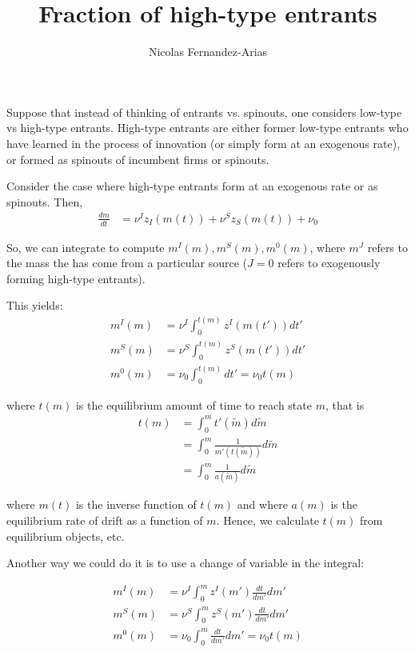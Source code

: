 \documentclass[12pt,english]{article}
\theoremstyle{remark}
\begin{document}
	
\title{Fraction of high-type entrants}
\author{Nicolas Fernandez-Arias}
\maketitle

Suppose that instead of thinking of entrants vs. spinouts, one considers low-type vs high-type entrants. High-type entrants are either former low-type entrants who have learned in the process of innovation (or simply form at an exogenous rate), or formed as spinouts of incumbent firms or spinouts. 

Consider the case where high-type entrants form at an exogenous rate or as spinouts. Then, 
\begin{align*}
	\frac{dm}{dt} &= \nu^I z_I(m(t)) + \nu^S z_S(m(t)) + \nu_0
\end{align*}

So, we can integrate to compute $m^I(m),m^S(m),m^0(m)$, where $m^J$ refers to the mass the has come from a particular source ($J = 0$ refers to exogenously forming high-type entrants).

This yields: 
\begin{align*}
	m^I(m) &= \nu^I \int_0^{t(m)} z^I(m(t')) dt' \\
	m^S(m) &= \nu^S \int_0^{t(m)} z^S(m(t')) dt'\\
	m^0(m) &= \nu_0 \int_0^{t(m)} dt' = \nu_0 t(m)
\end{align*}

where $t(m)$ is the equilibrium amount of time to reach state $m$, that is
\begin{align*}
	t(m) &= \int_0^m t'(\tilde{m}) d\tilde{m} \\
	     &= \int_0^m \frac{1}{m'(t(\tilde{m}))} d\tilde{m} \\
	     &= \int_0^m \frac{1}{a(\tilde{m})} d\tilde{m}
\end{align*}

where $m(t)$ is the inverse function of $t(m)$ and where $a(m)$ is the equilibrium rate of drift as a function of $m$. Hence, we calculate $t(m)$ from equilibrium objects, etc.

Another way we could do it is to use a change of variable in the integral:

\begin{align*}
m^I(m) &= \nu^I \int_0^m z^I(m') \frac{dt}{dm'} dm' \\
m^S(m) &= \nu^S \int_0^m z^S(m') \frac{dt}{dm'} dm' \\
m^0(m) &= \nu_0 \int_0^m \frac{dt}{dm'} dm' = \nu_0 t(m)
\end{align*}
\end{document}
